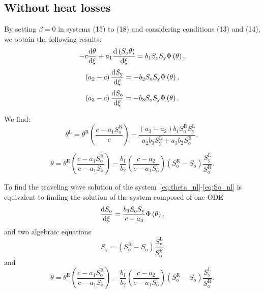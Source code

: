\subsection{Without heat losses}

By setting $\beta=0$ in systems (15) to (18) and considering
conditions (13) and (14), we obtain the following results:
\begin{equation}
	\label{eq:theta_nl}
	-c\diff{\theta}{\xi}+
	a_{1}\diff{\left(S_{\text{o}}\theta\right)}{\xi}=
	b_{1}S_{\text{o}}S_{\text{y}}\Phi\left(\theta\right),
\end{equation}
\begin{equation}
	\label{eq:Sy_nl}
	\left(a_{2}-c\right)\diff{S_{\text{y}}}{\xi}=
	-b_{2}S_{\text{o}}S_{\text{y}}\Phi\left(\theta\right),
\end{equation}
\begin{equation}
	\label{eq:So_nl}
	\left(a_{3}-c\right)\diff{S_{\text{o}}}{\xi}=
	-b_{3}S_{\text{o}}S_{\text{y}}\Phi\left(\theta\right).
\end{equation}

We find:
\begin{equation*}
	\theta^{\text{L}}=
	\theta^{\text{R}}
	\left(
	\frac{c-a_{1}S_{\text{o}}^{\text{R}}}{c}
	\right)-
	\frac{\left(a_{3}-a_{2}\right)b_{1}S_{\text{o}}^{\text{R}}S_{\text{y}}^{\text{L}}}{a_{2}b_{3}S_{\text{y}}^{\text{L}}+a_{3}b_{2}S_{\text{o}}^{\text{R}}},
\end{equation*}

\begin{equation*}
	\theta=
	\theta^{\text{R}}
	\left(\frac{c-a_{1}S_{\text{o}}^{\text{R}}}{c-a_{1}S_{\text{o}}}\right)-
	\frac{b_{1}}{b_{2}}
	\left(\frac{c-a_{2}}{c-a_{1}S_{\text{o}}}\right)
	\left(S_{\text{o}}^{\text{R}}-S_{\text{o}}\right)
	\frac{S_{\text{y}}^{\text{L}}}{S_{\text{o}}^{\text{R}}}.
\end{equation*}

To find the traveling wave solution of the system~\eqref{eq:theta_nl}-\eqref{eq:So_nl}
is equivalent to finding the solution of the system composed of one ODE
\begin{equation}
	\label{eq:So_ode_nl}
	\diff{S_{\text{o}}}{\xi}=
	\frac{b_{3}S_{\text{o}}S_{\text{y}}}{c-a_{3}}
	\Phi\left(\theta\right),
\end{equation}
and two algebraic equations
\begin{equation}
	\label{eq:Sy_alg_nl}
	S_{\text{y}}=
	\left(S_{\text{o}}^{\text{R}}-S_{\text{o}}\right)
	\frac{S_{\text{y}}^{\text{L}}}{S_{\text{o}}^{\text{R}}}
\end{equation}
and
\begin{equation}
	\label{eq:theta_alg_nl}
	\theta=
	\theta^{\text{R}}
	\left(\frac{c-a_{1}S_{\text{o}}^{\text{R}}}{c-a_{1}S_{\text{o}}}\right)-
	\frac{b_{1}}{b_{2}}
	\left(\frac{c-a_{2}}{c-a_{1}S_{\text{o}}}\right)
	\left(S_{\text{o}}^{\text{R}}-S_{\text{o}}\right)
	\frac{S_{\text{y}}^{\text{L}}}{S_{\text{o}}^{\text{R}}}.
\end{equation}

